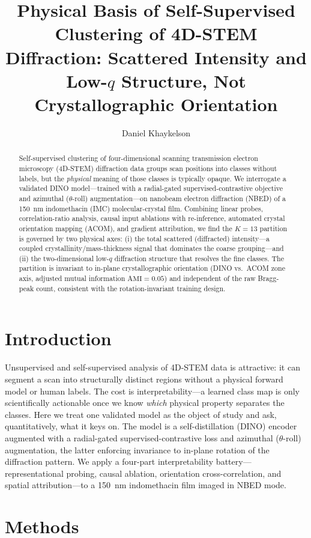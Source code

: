 \documentclass[journal=cmatex,manuscript=article,layout=twocolumn]{achemso}
\author{Daniel Khaykelson}
\affiliation{Department of Materials Science and Engineering, [Institution]}
\title{Physical Basis of Self-Supervised Clustering of 4D-STEM
Diffraction: Scattered Intensity and Low-$q$ Structure, Not
Crystallographic Orientation}
\begin{document}
\begin{abstract}
Self-supervised clustering of four-dimensional scanning transmission
electron microscopy (4D-STEM) diffraction data groups scan positions into
classes without labels, but the \emph{physical} meaning of those classes is
typically opaque. We interrogate a validated DINO model---trained with a
radial-gated supervised-contrastive objective and azimuthal ($\theta$-roll)
augmentation---on nanobeam electron diffraction (NBED) of a 150~nm
indomethacin (IMC) molecular-crystal film. Combining linear probes,
correlation-ratio analysis, causal input ablations with re-inference,
automated crystal orientation mapping (ACOM), and gradient attribution, we
find the $K=13$ partition is governed by two physical axes: (i) the total
scattered (diffracted) intensity---a coupled crystallinity/mass-thickness
signal that dominates the coarse grouping---and (ii) the two-dimensional
low-$q$ diffraction structure that resolves the fine classes. The partition
is invariant to in-plane crystallographic orientation (DINO vs.\ ACOM zone
axis, adjusted mutual information $\mathrm{AMI}=0.05$) and independent of the
raw Bragg-peak count, consistent with the rotation-invariant training design.
\end{abstract}

\section{Introduction}

Unsupervised and self-supervised analysis of 4D-STEM data is attractive: it
can segment a scan into structurally distinct regions without a physical
forward model or human labels.\cite{caron2021,savitzky2021} The cost is
interpretability---a learned class map is only scientifically actionable once
we know \emph{which} physical property separates the classes. Here we treat
one validated model as the object of study and ask, quantitatively, what it
keys on. The model is a self-distillation (DINO) encoder\cite{caron2021}
augmented with a radial-gated supervised-contrastive loss\cite{khosla2020}
and azimuthal ($\theta$-roll) augmentation, the latter enforcing invariance
to in-plane rotation of the diffraction pattern. We apply a four-part
interpretability battery---representational probing, causal ablation,
orientation cross-correlation, and spatial attribution---to a 150~nm
indomethacin film imaged in NBED mode.

\section{Methods}
\end{document}
